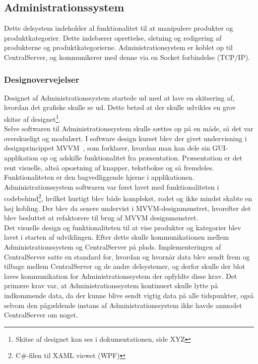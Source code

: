 \subsection{Administrationssystem}
Dette delsystem indeholder al funktionalitet til at manipulere produkter og produktkategorier. Dette indebærer oprettelse, sletning og redigering af produkterne og produktkategorierne. Administrationsystem er koblet op til CentralServer, og kommunikerer med denne via en Socket forbindelse (TCP/IP).

\subsubsection{Designovervejelser}
Designet af Administrationssystem startede ud med at lave en skitsering af, hvordan det grafiske skulle se ud. Dette betød at der skulle udvikles en grov skitse af designet\footnote{Skitse af designet kan ses i dokumentationen, side XYZ}.\\
Selve softwaren til Administrationssystem skulle sættes op på en måde, så det var overskueligt og modulært. I software design kurset blev der givet undervisning i designprincippet MVVM~\cite{MVVM}, som forklarer, hvordan man kan dele sin GUI-applikation op og adskille funktionalitet fra præsentation. Præsentation er det rent visuelle, altså opsætning af knapper, tekstbokse og så fremdeles. Funktionaliteten er den bagvedliggende hjerne i applikationen.\\
Administrationssystem softwaren var først lavet med funktionaliteten i codebehind\footnote{C\#-filen til XAML viewet (WPF)}, hvilket hurtigt blev både komplekst, rodet og ikke mindst skabte en høj kobling. Der blev da senere undervist i MVVM-designmønstret, hvorefter det blev besluttet at refaktorere til brug af MVVM designmønstret.\\
Det visuelle design og funktionaliteten til at vise produkter og kategorier blev lavet i starten af udviklingen. Efter dette skulle kommunikationen mellem Administrationssystem og CentralServer på plads. Implementeringen af CentralServer satte en standard for, hvordan og hvornår data blev sendt frem og tilbage mellem CentralServer og de andre delsystemer, og derfor skulle der blot laves kommunikation for Administrationssystem der opfyldte disse krav. Det primære krav var, at Administrationssystem kontinuert skulle lytte på indkommende data, da der kunne blive sendt vigtig data på alle tidspunkter, også selvom den pågældende instans af Administrationssystem ikke havde anmodet CentralServer om noget.

